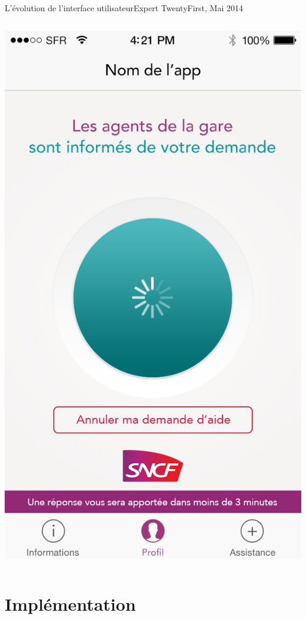\documentclass{beamer}
\begin{document}
\begin{frame}{L'évolution de l'interface utilisateur}{Expert TwentyFirst, Mai 2014}
\begin{columns}
\begin{column}{0.45\textwidth}
            \includegraphics[width=\textwidth]{thibault-04/02-encours.jpg}
        \end{column}
    \end{columns}
\end{frame}
\section{Implémentation}
\end{document}
